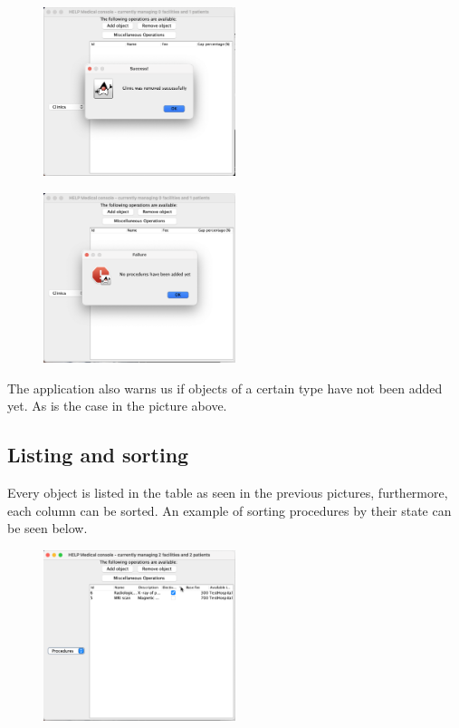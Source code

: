 \documentclass{article}
\begin{document}
\begin{figure}
  \begin{center}
  \includegraphics[width=0.5\textwidth]{./figures/Remove/Clinic_3.png}
  \end{center}
\end{figure}

\begin{figure}
  \begin{center}
    \includegraphics[width=0.5\textwidth]{./figures/Remove/Procedures_1.png}
  \end{center}
\end{figure}

The application also warns us if objects of a certain type have not been added yet. As is the case in the picture above.

\newpage

\subsection{Listing and sorting}\label{sub:listing_and_sorting}
Every object is listed in the table as seen in the previous pictures, furthermore, each column can be sorted. An example of sorting procedures by their state can be seen below.
\begin{figure}
  \begin{center}
    \includegraphics[width=0.5\textwidth]{figures/Listing/Sorting.png}
  \end{center}
\end{figure}
\end{document}
